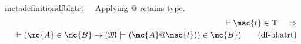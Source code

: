 \begin{restatable}{metadefinition}{dfblatrt}~~ Applying @ retains type.
\begin{align}
\vdash \msc{t} \in \mathbf{T}\quad\Rightarrow \notag \\ 
	\quad \vdash ( \mc{A} \in \mc{B}
    \rightarrow ( \mathfrak{M} \models ( \mc{A} @ \msc{t} ) ) \in \mc{B}
    )\label{eq:df-bl.atrt}\tag{df-bl.atrt}
\end{align}
\end{restatable}

